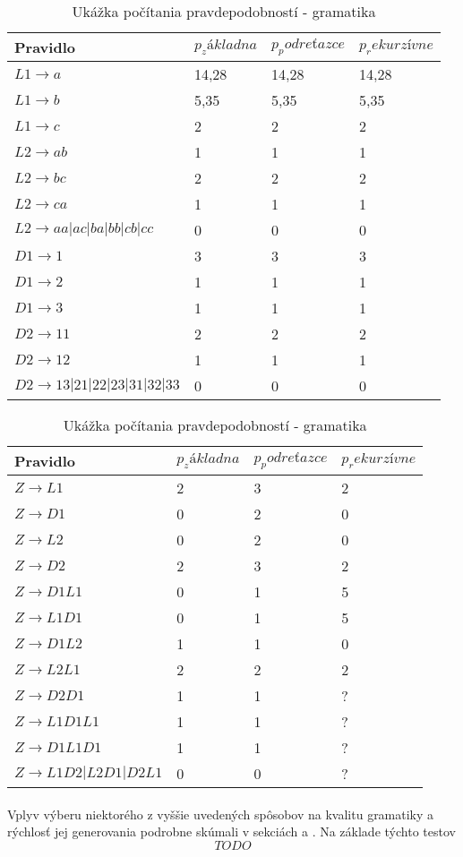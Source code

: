 \begin{table}[]
\centering
\caption{Ukážka počítania pravdepodobností - gramatika}
\label{gramatikaPP}
\begin{tabular}{l|lll}
Pravidlo & \(p_základna\) & \(p_podreťazce\) & \(p_rekurzívne\) \\ \hline
\(L1 \to a\) & 14,28 & 14,28 & 14,28 \\
\(L1 \to b\) & 5,35 & 5,35 & 5,35 \\
\(L1 \to c\) & 2 & 2 & 2 \\
\(L2 \to ab\) & 1 & 1 & 1 \\
\(L2 \to bc\) & 2 & 2 & 2 \\
\(L2 \to ca\) & 1 & 1 & 1 \\
\(L2 \to aa|ac|ba|bb|cb|cc\) & 0 & 0 & 0 \\
\(D1 \to 1\) & 3 & 3 & 3 \\
\(D1 \to 2\) & 1 & 1 & 1 \\
\(D1 \to 3\) & 1 & 1 & 1 \\
\(D2 \to 11\) & 2 & 2 & 2 \\
\(D2 \to 12\) & 1 & 1 & 1 \\
\(D2 \to 13|21|22|23|31|32|33\) & 0 & 0 & 0 
\end{tabular}
\quad
\begin{tabular}{l|lll}
Pravidlo & \(p_základna\) & \(p_podreťazce\) & \(p_rekurzívne\) \\ \hline
\(Z \to L1\) & 2 & 3 & 2 \\
\(Z \to D1\) & 0 & 2 & 0 \\
\(Z \to L2\) & 0 & 2 & 0 \\
\(Z \to D2\) & 2 & 3 & 2 \\
\(Z \to D1L1\) & 0 & 1 & 5 \\
\(Z \to L1D1\) & 0 & 1 & 5 \\
\(Z \to D1L2\) & 1 & 1 & 0 \\
\(Z \to L2L1\) & 2 & 2 & 2 \\
\(Z \to D2D1\) & 1 & 1 & ? \\
\(Z \to L1D1L1\) & 1 & 1 & ? \\
\(Z \to D1L1D1\) & 1 & 1 & ? \\
\(Z \to L1D2|L2D1|D2L1\) & 0 & 0 & ? \\
\end{tabular}
\end{table}

\paragraph{}
Vplyv výberu niektorého z vyššie uvedených spôsobov na kvalitu gramatiky a rýchlosť jej generovania podrobne skúmali v sekciách \label{sec:time} a \label{sec:pass}. Na základe týchto testov \[TODO\]

